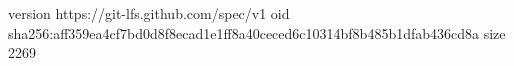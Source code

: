 version https://git-lfs.github.com/spec/v1
oid sha256:aff359ea4cf7bd0d8f8ecad1e1ff8a40ceced6c10314bf8b485b1dfab436cd8a
size 2269
